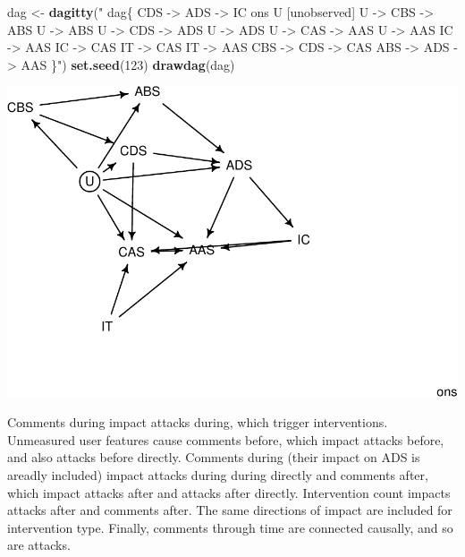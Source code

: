 \documentclass[10pt,dvipsnames,enabledeprecatedfontcommands]{scrartcl}
\newenvironment{Shaded}{\begin{snugshade}}{\end{snugshade}}
\newcommand{\DecValTok}[1]{\textcolor[rgb]{0.00,0.00,0.81}{#1}}
\newcommand{\KeywordTok}[1]{\textcolor[rgb]{0.13,0.29,0.53}{\textbf{#1}}}
\newcommand{\NormalTok}[1]{#1}
\newcommand{\StringTok}[1]{\textcolor[rgb]{0.31,0.60,0.02}{#1}}
\begin{document}
\begin{Shaded}
\begin{Highlighting}[]
\NormalTok{dag <-}\StringTok{ }\KeywordTok{dagitty}\NormalTok{(}\StringTok{"}
\StringTok{  dag\{}
\StringTok{  CDS -> ADS -> IC  ons}
\StringTok{               U [unobserved]   }
\StringTok{               U -> CBS -> ABS  }
\StringTok{               U -> ABS        }
\StringTok{               U -> CDS -> ADS  }
\StringTok{               U -> ADS         }
\StringTok{               U -> CAS -> AAS    }
\StringTok{               U -> AAS                        }
\StringTok{               IC -> AAS        }
\StringTok{               IC -> CAS        }
\StringTok{               IT -> CAS        }
\StringTok{               IT -> AAS}
\StringTok{               CBS -> CDS -> CAS}
\StringTok{               ABS -> ADS -> AAS}
\StringTok{               \}"}\NormalTok{)}
\KeywordTok{set.seed}\NormalTok{(}\DecValTok{123}\NormalTok{)}
\KeywordTok{drawdag}\NormalTok{(dag)}
\end{Highlighting}
\end{Shaded}

\begin{center}\includegraphics[width=1\linewidth]{bayesianReport_files/figure-latex/dag1-1} \end{center}
\normalsize

Comments during impact attacks during, which trigger interventions.
Unmeasured user features cause comments before, which impact attacks
before, and also attacks before directly. Comments during (their impact
on ADS is areadly included) impact attacks during during directly and
comments after, which impact attacks after and attacks after directly.
Intervention count impacts attacks after and comments after. The same
directions of impact are included for intervention type. Finally,
comments through time are connected causally, and so are attacks.
\end{document}
